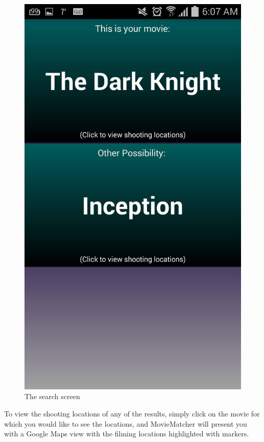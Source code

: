 \documentclass[11pt,a4paper]{article}
\begin{document}
\begin{figure}[H]
\centering
\includegraphics[scale=.08]{screen2.jpg}
\caption{The search screen}
\end{figure} 

To view the shooting locations of any of the results, simply click on the movie for which you would like to see the locations, and MovieMatcher will present you with a Google Maps view with the filming locations highlighted with markers.\\
\end{document}

